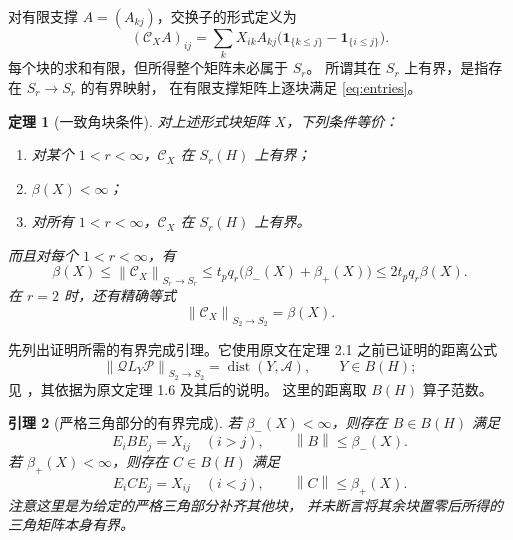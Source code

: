 \documentclass[UTF8,11pt,a4paper,fontset=fandol]{ctexart}
\newtheorem{theorem}{定理}[section]
\newtheorem{lemma}[theorem]{引理}
\theoremstyle{remark}
\newcommand{\BH}{B(H)}
\newcommand{\dist}{\operatorname{dist}}
\newcommand{\PP}{\mathcal P}
\newcommand{\QQ}{\mathcal Q}
\newcommand{\Alg}{\mathcal A}
\newcommand{\CC}{\mathcal C}
\newcommand{\norm}[1]{\left\lVert #1\right\rVert}
\numberwithin{equation}{section}
\begin{document}
对有限支撑 $A=(A_{kj})$，交换子的形式定义为
\begin{equation}\label{eq:entries}
 (\CC_X A)_{ij}
 =\sum_k X_{ik}A_{kj}
 \bigl(\mathbf1_{\{k\leq j\}}-\mathbf1_{\{i\leq j\}}\bigr).
\end{equation}
每个块的求和有限，但所得整个矩阵未必属于 $S_r$。
所谓其在 $S_r$ 上有界，是指存在 $S_r\to S_r$ 的有界映射，
在有限支撑矩阵上逐块满足 \eqref{eq:entries}。

\begin{theorem}[一致角块条件]\label{thm:sharp}
对上述形式块矩阵 $X$，下列条件等价：
\begin{enumerate}[label=\textup{(\roman*)}]
 \item 对某个 $1<r<\infty$，$\CC_X$ 在 $S_r(H)$ 上有界；
 \item $\beta(X)<\infty$；
 \item 对所有 $1<r<\infty$，$\CC_X$ 在 $S_r(H)$ 上有界。
\end{enumerate}
而且对每个 $1<r<\infty$，有
\begin{equation}\label{eq:sharpbounds}
 \boxed{\quad
 \beta(X)\leq\norm{\CC_X}_{S_r\to S_r}
 \leq t_pq_r\bigl(\beta_-(X)+\beta_+(X)\bigr)
 \leq2t_pq_r\beta(X).
 \quad}
\end{equation}
在 $r=2$ 时，还有精确等式
\begin{equation}\label{eq:exact2}
 \norm{\CC_X}_{S_2\to S_2}=\beta(X).
\end{equation}
\end{theorem}

先列出证明所需的有界完成引理。它使用原文在定理 2.1
之前已证明的距离公式
\begin{equation}\label{eq:nehari}
 \norm{\QQ L_Y\PP}_{S_2\to S_2}=\dist(Y,\Alg),
 \qquad Y\in\BH;
\end{equation}
见 \cite[p.~277]{Power}，其依据为原文定理 1.6 及其后的说明。
这里的距离取 $B(H)$ 算子范数。

\begin{lemma}[严格三角部分的有界完成]\label{lem:completion}
若 $\beta_-(X)<\infty$，则存在 $B\in\BH$ 满足
\[
 E_iBE_j=X_{ij}\quad(i>j),\qquad
 \norm B\leq\beta_-(X).
\]
若 $\beta_+(X)<\infty$，则存在 $C\in\BH$ 满足
\[
 E_iCE_j=X_{ij}\quad(i<j),\qquad
 \norm C\leq\beta_+(X).
\]
注意这里是为给定的严格三角部分\emph{补齐其他块}，
并未断言将其余块置零后所得的三角矩阵本身有界。
\end{lemma}
\end{document}
